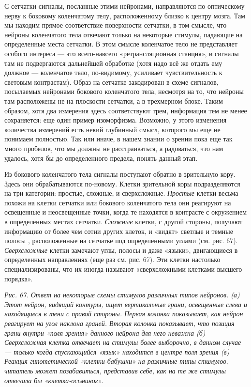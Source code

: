 \documentclass[../main.tex]{subfiles}
\begin{document}
С сетчатки сигналы, посланные этими нейронами, направляются по оптическому нерву к боковому коленчатому телу, расположенному близко к центру мозга. Там мы находим прямое соответствие поверхности сетчатки, в том смысле, что нейроны коленчатого тела отвечают только на некоторые стимулы, падающие на определенные места сетчатки. В этом смысле коленчатое тело не представляет особого интереса --- это всего-навсего «ретрансляционная станция», и сигналы там не подвергаются дальнейшей обработке (хотя надо всё же отдать ему должное --- коленчатое тело, по-видимому, усиливает чувствительность к световым контрастам). Образ на сетчатке закодирован в схеме сигналов, посылаемых нейронами бокового коленчатого тела, несмотря на то, что нейроны там расположены не на плоскости сетчатки, а в трехмерном блоке. Таким образом, хотя два измерения здесь соответствуют трем, информация тем не менее сохраняется: еще один пример изоморфизма. Возможно, у этого изменения количества измерений есть некий глубинный смысл, которого мы еще не понимаем полностью. Так или иначе, в нашем знании о зрении пока еще так много пробелов, что мы должны не расстраиваться, а радоваться, что нам удалось, хотя бы до определенного предела, понять данный этап.

Из бокового коленчатого тела сигналы поступают обратно в зрительную кору. Здесь они обрабатываются по-новому. Клетки зрительной коры подразделяются на три категории: простые, сложные, и сверхсложные. \emph{Простые} клетки весьма похожи на клетки сетчатки или бокового коленчатого тела они реагируют на освещенные и неосвещенные точки, когда те находятся в контрасте с окружением в определенных местах сетчатки. \emph{Сложные} клетки, с другой стороны, получают информацию от более чем сотни других клеток, и «видят» светлые и темные полосы , расположенные на сетчатке под определенными углами (см. рис. 67). \emph{Сверхсложные} клетки замечают углы, полосы и даже «языки», двигающиеся в определенных направлениях (еще раз см. рис. 67). Эти клетки настолько специализированы, что их иногда называют «сверхсложными клетками высшего порядка».

\emph{Рис. 67. Ответ на некоторые схемы стимулов различных типов нейронов. (а) Этот нейрон, видящий контуры, ищет вертикальные грани, освещенные слева и находящиеся в тени с правой стороны. Первая колонка показывает, как нейрон реагирует на угол наклона граней. Вторая колонка показывает, что позиция грани внутри «поля зрения» данного нейрона для него неважна (б) Сверхсложная клетка отвечает на стимулы более выборочно, в данном случае --- только когда спускающийся «язык» находится в центре поля зрения (в) Реакция гипотетической «клетки-бабушки» на различные типы стимулов, читатель может позабавиться, представив себе, как на те же стимулы отвечала бы «клетка-осьминог».}
\end{document}
